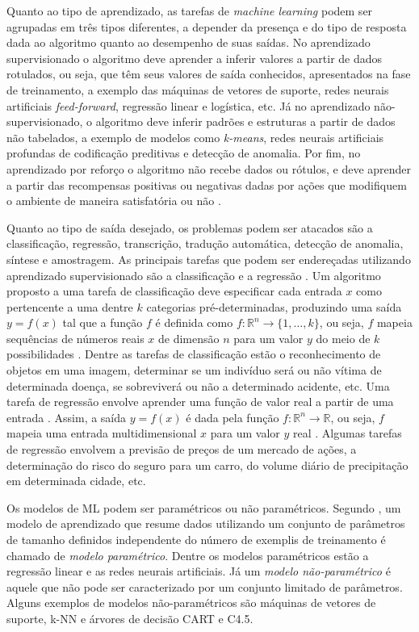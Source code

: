 Quanto ao tipo de aprendizado, as tarefas de \emph{machine learning} podem ser agrupadas em três tipos diferentes, a depender da presença e do tipo de resposta dada ao algoritmo quanto ao desempenho de suas saídas. No aprendizado supervisionado o algoritmo deve aprender a inferir valores a partir de dados rotulados, ou seja, que têm seus valores de saída conhecidos, apresentados na fase de treinamento, a exemplo das máquinas de vetores de suporte, redes neurais artificiais \emph{feed-forward}, regressão linear e logística, etc. Já no aprendizado não-supervisionado, o algoritmo deve inferir padrões e estruturas a partir de dados não tabelados, a exemplo de modelos como \emph{k-means}, redes neurais artificiais profundas de codificação preditivas e detecção de anomalia. Por fim, no aprendizado por reforço o algoritmo não recebe dados ou rótulos, e deve aprender a partir das recompensas positivas ou negativas dadas por ações que modifiquem o ambiente de maneira satisfatória ou não \cite{flach2012machine}.

Quanto ao tipo de saída desejado, os problemas podem ser atacados são a classificação, regressão, transcrição, tradução automática, detecção de anomalia, síntese e amostragem. As principais tarefas que podem ser endereçadas utilizando aprendizado supervisionado são a classificação e a regressão \cite{flach2012machine}. Um algoritmo proposto a uma tarefa de classificação deve especificar cada entrada $x$ como pertencente a uma dentre $k$ categorias pré-determinadas, produzindo uma saída $y=f(x)$ tal que a função $f$ é definida como $f: \mathds{R}^n \rightarrow \{1, \ldots, k\}$, ou seja, $f$ mapeia sequências de números reais  $x$ de dimensão $n$ para um valor $y$ do meio de $k$ possibilidades \cite{goodfellow2016deep}. Dentre as tarefas de classificação estão o reconhecimento de objetos em uma imagem, determinar se um indivíduo será ou não vítima de determinada doença, se sobreviverá ou não a determinado acidente, etc. Uma tarefa de regressão envolve aprender uma função de valor real a partir de uma entrada \cite{flach2012machine}. Assim, a saída $y=f(x)$ é dada pela função $f: \mathds{R}^n \rightarrow \mathds{R}$, ou seja, $f$ mapeia uma entrada multidimensional $x$ para um valor $y$ real  \cite{goodfellow2016deep}. Algumas tarefas de regressão envolvem a previsão de preços de um mercado de ações, a determinação do risco do seguro para um carro, do volume diário de precipitação em determinada cidade, etc.

Os modelos de ML podem ser paramétricos ou não paramétricos. Segundo \cite{russell2016artificial}, um modelo de aprendizado que resume dados utilizando um conjunto de parâmetros de tamanho definidos independente do número de exemplis de treinamento é chamado de \emph{modelo paramétrico}. Dentre os modelos paramétricos estão a regressão linear e as redes neurais artificiais. Já um \emph{modelo não-paramétrico} é aquele que não pode ser caracterizado por um conjunto limitado de parâmetros. Alguns exemplos de modelos não-paramétricos são máquinas de vetores de suporte, k-NN e árvores de decisão CART e C4.5.


